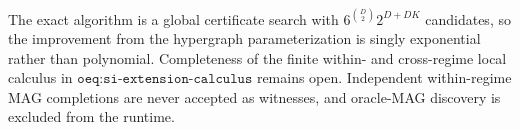The exact algorithm is a global certificate search with \(6^{\binom D2}2^{D+DK}\) candidates, so the improvement from the hypergraph parameterization is singly exponential rather than polynomial.  Completeness of the finite within- and cross-regime local calculus in \(\texttt{oeq:si-extension-calculus}\) remains open.  Independent within-regime MAG completions are never accepted as witnesses, and oracle-MAG discovery is excluded from the runtime.